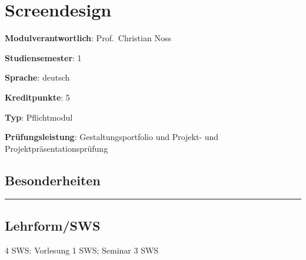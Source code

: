 \hypertarget{screendesignpathlabel....srcmodulbeschreibungen-bachelor-bpo5ba_screendesign}{%
\chapter{Screendesign\label{../../src/modulbeschreibungen-bachelor-bpo5/BA_Screendesign}}\label{screendesignpathlabel....srcmodulbeschreibungen-bachelor-bpo5ba_screendesign}}

\begin{modulHead}
\textbf{Modulverantwortlich}: Prof.~Christian
Noss
\end{modulHead}
\begin{modulHead}
\textbf{Studiensemester}:
1
\end{modulHead}
\begin{modulHead}
\textbf{Sprache}:
deutsch
\end{modulHead}
\begin{modulHead}
\textbf{Kreditpunkte}:
5
\end{modulHead}
\begin{modulHead}
\textbf{Typ}:
Pflichtmodul
\end{modulHead}
\begin{modulHead}
\textbf{Prüfungsleistung}:
Gestaltungsportfolio und Projekt- und
Projektpräsentationsprüfung
\end{modulHead}


\hypertarget{besonderheitenpathlabel....srcmodulbeschreibungen-bachelor-bpo5ba_screendesign}{%
\section*{Besonderheiten\label{../../src/modulbeschreibungen-bachelor-bpo5/BA_Screendesign}}\label{besonderheitenpathlabel....srcmodulbeschreibungen-bachelor-bpo5ba_screendesign}}

\begin{center}\rule{0.5\linewidth}{0.5pt}\end{center}

\hypertarget{lehrformswspathlabel....srcmodulbeschreibungen-bachelor-bpo5ba_screendesign}{%
\section*{Lehrform/SWS\label{../../src/modulbeschreibungen-bachelor-bpo5/BA_Screendesign}}\label{lehrformswspathlabel....srcmodulbeschreibungen-bachelor-bpo5ba_screendesign}}

4 SWS: Vorlesung 1 SWS; Seminar 3 SWS

